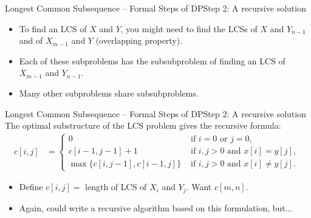\documentclass[aspectratio=169]{beamer}
\begin{document}
\begin{frame}{Longest Common Subsequence -- Formal Steps of DP}{Step 2: A recursive solution}
    \begin{itemize}
        \item To find an LCS of $X$ and $Y$, you might need to find the LCSs of $X$ and $Y_{n-1}$ and of $X_{m-1}$ and $Y$ (overlapping property).
        \item Each of these subproblems has the subsubproblem of finding an LCS of $X_{m-1}$ and $Y_{n-1}$.
        \item Many other subproblems share subsubproblems.
    \end{itemize}
\end{frame}

\begin{frame}{Longest Common Subsequence -- Formal Steps of DP}{Step 2: A recursive solution}
    The optimal substructure of the LCS problem gives the recursive formula:
    \begin{equation*}
        \begin{align*}
            c[i, j] &=
                        \begin{cases}
                            0 & \text{ if } i = 0 \text{ or } j = 0 \text{, } \\
                            c[i - 1, j - 1] + 1 & \text{ if } i,j > 0 \text{ and } x[i] = y[j] \text{, } \\
                            \max \{ c[i, j - 1], c[i - 1, j] \} & \text{ if } i,j > 0 \text{ and } x[i] \neq y[j].
                        \end{cases}
        \end{align*}
    \end{equation*}
    \begin{itemize} \pause
        \item Define $c[i,j] =$ length of LCS of $X_i$ and $Y_j$. Want $c[m,n]$. \pause
        \item Again, could write a recursive algorithm based on this formulation, but...
    \end{itemize}
\end{frame}
\end{document}
